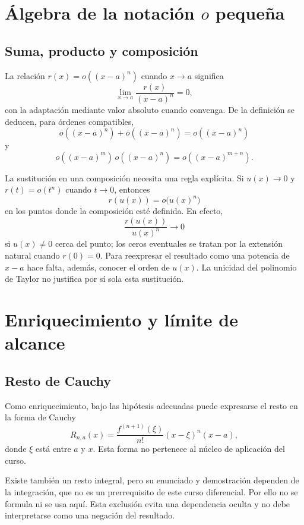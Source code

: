 \section{Álgebra de la notación \(o\) pequeña}
\label{sec:algebra-o-pequena}

\subsection{Suma, producto y composición}

La relación \(r(x)=o((x-a)^n)\) cuando \(x\to a\) significa
\[
  \lim_{x\to a}\frac{r(x)}{(x-a)^n}=0,
\]
con la adaptación mediante valor absoluto cuando convenga. De la definición
se deducen, para órdenes compatibles,
\[
  o((x-a)^n)+o((x-a)^n)=o((x-a)^n)
\]
y
\[
  o((x-a)^m)\,o((x-a)^n)=o((x-a)^{m+n}).
\]

La sustitución en una composición necesita una regla explícita. Si
\(u(x)\to0\) y \(r(t)=o(t^n)\) cuando \(t\to0\), entonces
\[
  r(u(x))=o\bigl(u(x)^n\bigr)
\]
en los puntos donde la composición esté definida. En efecto,
\[
  \frac{r(u(x))}{u(x)^n}\longrightarrow0
\]
si \(u(x)\ne0\) cerca del punto; los ceros eventuales se tratan por la
extensión natural cuando \(r(0)=0\). Para reexpresar el resultado como una
potencia de \(x-a\) hace falta, además, conocer el orden de \(u(x)\). La
unicidad del polinomio de Taylor no justifica por sí sola esta sustitución.

\section{Enriquecimiento y límite de alcance}
\label{sec:restos-enriquecimiento}

\subsection{Resto de Cauchy}

Como enriquecimiento, bajo las hipótesis adecuadas puede expresarse el resto
en la forma de Cauchy
\[
  R_{n,a}(x)
  =\frac{f^{(n+1)}(\xi)}{n!}(x-\xi)^n(x-a),
\]
donde \(\xi\) está entre \(a\) y \(x\). Esta forma no pertenece al núcleo de
aplicación del curso.

Existe también un resto integral, pero su enunciado y demostración dependen de
la integración, que no es un prerrequisito de este curso diferencial. Por
ello no se formula ni se usa aquí. Esta exclusión evita una dependencia
oculta y no debe interpretarse como una negación del resultado.

